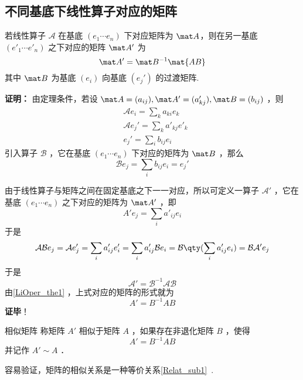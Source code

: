 \subsection{不同基底下线性算子对应的矩阵}\label{LiOper_sub1}
\begin{theorem}{}\label{LiOper_the2}
若线性算子 $\mathcal A$ 在基底 $( e_1\cdots  e_n)$ 下对应矩阵为 $\mat A$，则在另一基底  $( e'_1\cdots  e'_n)$ 之下对应的矩阵 $\mat A'$ 为
\begin{equation}
\mat A'=\mat B^{-1}\mat{AB}
\end{equation}
其中 $\mat B$ 为基底 $( e_i)$ 向基底 $( e_j')$ 的过渡矩阵.
\end{theorem}
\textbf{证明：}
由定理条件，若设 $\mat A=(a_{ij}), \mat A'=(a_{kj}'),\mat B=(b_{ij})$ ，则
\begin{equation}
\begin{aligned}
&\mathcal{A} e_i=\sum_{k} a_{ki} e_k
\\
&\mathcal{A} e_j'=\sum_{k} a'_{kj} e'_k\\
& e_j'=\sum_i b_{ij} e_i
\end{aligned}
\end{equation}
引入算子 $\mathcal{B}$ ，它在基底 $( e_1\cdots  e_n)$ 下对应的矩阵为 $\mat B$ ，那么
\begin{equation}
\mathcal{B} e_j=\sum_i b_{ij} e_i= e_j'
\end{equation}

由于线性算子与矩阵之间在固定基底之下一一对应，所以可定义一算子 $\mathcal{A'}$ ，它在基底 $( e_1\cdots  e_n)$ 之下对应的矩阵为 $\mat A'$ ，即
\begin{equation}
A' e_j=\sum_i a'_{ij} e_i
\end{equation}
于是
\begin{equation}
\mathcal{AB} e_j=\mathcal{A} e'_j=\sum_i a'_{ij}  e'_i=\sum_i a'_{ij}\mathcal{B} e_i=\mathcal{B}\qty(\sum_i a'_{ij} e_i)=\mathcal{BA'} e_j
\end{equation}
于是 
\begin{equation}
\mathcal{A'}=\mathcal{B}^{-1}\mathcal{AB}
\end{equation}
由\autoref{LiOper_the1} ，上式对应的矩阵的形式就为
\begin{equation}
A'=B^{-1}AB
\end{equation}
\textbf{证毕}！
\begin{definition}{相似矩阵}
称矩阵 $A'$ 相似于矩阵 $A$ ，如果存在非退化矩阵 $B$ ，使得
\begin{equation}
A'=B^{-1}AB
\end{equation}
并记作 $A'\sim A$ ．
\end{definition}
容易验证，矩阵的相似关系是一种等价关系\autoref{Relat_sub1}~.

